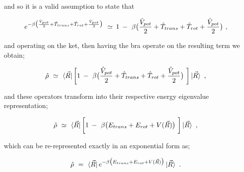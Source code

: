\documentclass{ece}
\begin{document}
and so it is a valid assumption to state that

\begin{equation} \label{eq:41}
e^{- \beta \big( \frac{\hat{V}_{pot}}{2} + \hat{T}_{trans} + \hat{T}_{rot} + \frac{\hat{V}_{pot}}{2} \big) } \hspace{0.125cm} \simeq \hspace{0.075cm} 1 \hspace{0.075cm} - \hspace{0.125cm} \beta \big( \frac{\hat{V}_{pot}}{2} + \hat{T}_{trans} + \hat{T}_{rot} + \frac{\hat{V}_{pot}}{2} \big) \hspace{0.125cm} ,
\end{equation}

and operating on the ket, then having the bra operate on the resulting term we obtain;

\begin{equation} \label{eq:42}
\hat{\rho} \hspace{0.125cm} \simeq \hspace{0.125cm} \bra{\vec{R}} \bigg[ 1 \hspace{0.075cm} - \hspace{0.125cm} \beta \big( \frac{\hat{V}_{pot}}{2} + \hat{T}_{trans} + \hat{T}_{rot} + \frac{\hat{V}_{pot}}{2} \big) \hspace{0.125cm} \bigg] \ket{\vec{R}} \hspace{0.125cm} ,
\end{equation}

and these operators transform into their respective energy eigenvalue representation;

\begin{equation} \label{eq:43}
\hat{\rho} \hspace{0.125cm} \simeq \hspace{0.125cm} \bra{\vec{R}} \bigg[ 1 \hspace{0.075cm} - \hspace{0.125cm} \beta \big( E_{trans} + E_{rot} + V(\vec{R})\big) \hspace{0.125cm} \bigg] \ket{\vec{R}} \hspace{0.125cm} ,
\end{equation}

which can be re-represented exactly in an exponential form as;

\begin{equation} \label{eq:44}
\hat{\rho} \hspace{0.125cm} = \hspace{0.125cm} \bra{\vec{R}} e^{ - \beta \big( E_{trans} + E_{rot} + V(\vec{R})\big)} \ket{\vec{R}} \hspace{0.125cm} .
\end{equation}
\end{document}
